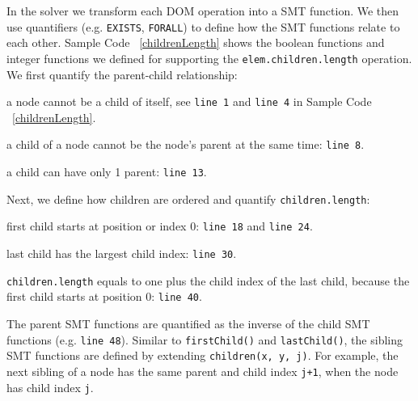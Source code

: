 In the solver we transform each DOM operation into a SMT function.  We then use quantifiers (e.g. {\tt EXISTS}, {\tt FORALL}) to define how the SMT functions relate to each other.  
Sample Code ~\ref{childrenLength} shows the boolean functions and integer functions we defined for supporting the {\tt elem.children.length} operation.  We first quantify the parent-child relationship: 
\begin{compactitem}
\item a node cannot be a child of itself, see {\tt line 1} and {\tt line 4} in Sample Code ~\ref{childrenLength}.
\item a child of a node cannot be the node's parent at the same time: {\tt line 8}.
\item a child can have only 1 parent: {\tt line 13}.
\end{compactitem}
Next, we define how children are ordered and quantify {\tt children.length}:
\begin{compactitem} 
\item first child starts at position or index 0: {\tt line 18} and {\tt line 24}.
\item last child has the largest child index: {\tt line 30}.
\item {\tt children.length} equals to one plus the child index of the last child, because the first child starts at position 0: {\tt line 40}.
\end{compactitem}
The parent SMT functions are quantified as the inverse of the child SMT functions (e.g. {\tt line 48}).  Similar to {\tt firstChild()} and {\tt lastChild()}, the sibling SMT functions are defined by extending {\tt children(x, y, j)}.  
For example, the next sibling of a node has the same parent and child index {\tt j+1}, when the node has child index {\tt j}.

